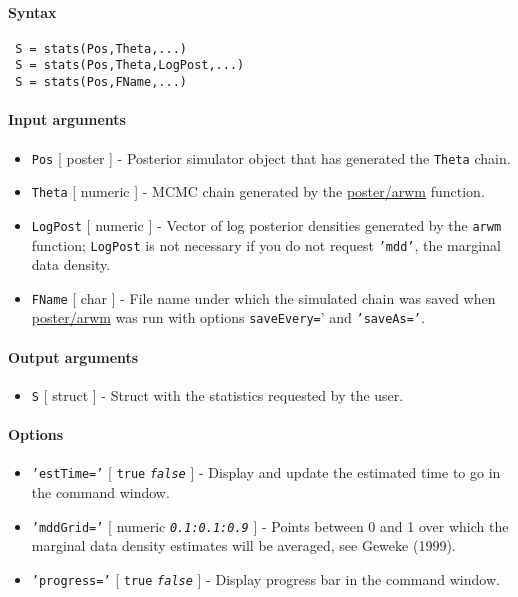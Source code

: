 


	\paragraph{Syntax}
 
 \begin{verbatim}
 S = stats(Pos,Theta,...)
 S = stats(Pos,Theta,LogPost,...)
 S = stats(Pos,FName,...)
 \end{verbatim}
 
 \paragraph{Input arguments}
 
 \begin{itemize}
 \item
   \texttt{Pos} {[} poster {]} - Posterior simulator object that has
   generated the \texttt{Theta} chain.
 \item
   \texttt{Theta} {[} numeric {]} - MCMC chain generated by the
   \url{poster/arwm} function.
 \item
   \texttt{LogPost} {[} numeric {]} - Vector of log posterior densities
   generated by the \texttt{arwm} function; \texttt{LogPost} is not
   necessary if you do not request \texttt{'mdd'}, the marginal data
   density.
 \item
   \texttt{FName} {[} char {]} - File name under which the simulated
   chain was saved when \url{poster/arwm} was run with options
   \texttt{saveEvery=}' and \texttt{'saveAs='}.
 \end{itemize}
 
 \paragraph{Output arguments}
 
 \begin{itemize}
 \item
   \texttt{S} {[} struct {]} - Struct with the statistics requested by
   the user.
 \end{itemize}
 
 \paragraph{Options}
 
 \begin{itemize}
 \item
   \texttt{'estTime='} {[} \texttt{true} \textbar{} \emph{\texttt{false}}
   {]} - Display and update the estimated time to go in the command
   window.
 \item
   \texttt{'mddGrid='} {[} numeric \textbar{} \emph{\texttt{0.1:0.1:0.9}}
   {]} - Points between 0 and 1 over which the marginal data density
   estimates will be averaged, see Geweke (1999).
 \item
   \texttt{'progress='} {[} \texttt{true} \textbar{}
   \emph{\texttt{false}} {]} - Display progress bar in the command
   window.
 \end{itemize}
 
